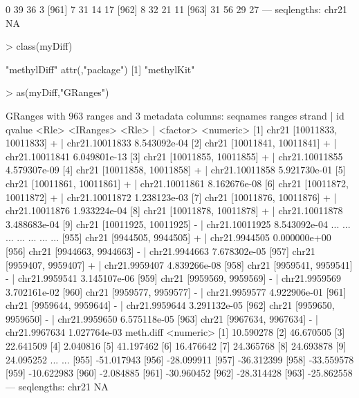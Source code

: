 \documentclass{article}
\begin{document}
\begin{Schunk}
\begin{Soutput}
  [960]         0        39        36         3
  [961]         7        31        14        17
  [962]         8        32        21        11
  [963]        31        56        29        27
  ---
  seqlengths:
   chr21
      NA
\end{Soutput}
\begin{Sinput}
> class(myDiff)
\end{Sinput}
\begin{Soutput}
[1] "methylDiff"
attr(,"package")
[1] "methylKit"
\end{Soutput}
\begin{Sinput}
> as(myDiff,"GRanges")
\end{Sinput}
\begin{Soutput}
GRanges with 963 ranges and 3 metadata columns:
        seqnames               ranges strand   |             id       qvalue
           <Rle>            <IRanges>  <Rle>   |       <factor>    <numeric>
    [1]    chr21 [10011833, 10011833]      +   | chr21.10011833 8.543092e-04
    [2]    chr21 [10011841, 10011841]      +   | chr21.10011841 6.049801e-13
    [3]    chr21 [10011855, 10011855]      +   | chr21.10011855 4.579307e-09
    [4]    chr21 [10011858, 10011858]      +   | chr21.10011858 5.921730e-01
    [5]    chr21 [10011861, 10011861]      +   | chr21.10011861 8.162676e-08
    [6]    chr21 [10011872, 10011872]      +   | chr21.10011872 1.238123e-03
    [7]    chr21 [10011876, 10011876]      +   | chr21.10011876 1.933224e-04
    [8]    chr21 [10011878, 10011878]      +   | chr21.10011878 3.488683e-04
    [9]    chr21 [10011925, 10011925]      -   | chr21.10011925 8.543092e-04
    ...      ...                  ...    ... ...            ...          ...
  [955]    chr21   [9944505, 9944505]      +   |  chr21.9944505 0.000000e+00
  [956]    chr21   [9944663, 9944663]      -   |  chr21.9944663 7.678302e-05
  [957]    chr21   [9959407, 9959407]      +   |  chr21.9959407 4.839266e-08
  [958]    chr21   [9959541, 9959541]      -   |  chr21.9959541 3.145107e-06
  [959]    chr21   [9959569, 9959569]      -   |  chr21.9959569 3.702161e-02
  [960]    chr21   [9959577, 9959577]      -   |  chr21.9959577 4.922906e-01
  [961]    chr21   [9959644, 9959644]      -   |  chr21.9959644 3.291132e-05
  [962]    chr21   [9959650, 9959650]      -   |  chr21.9959650 6.575118e-05
  [963]    chr21   [9967634, 9967634]      -   |  chr21.9967634 1.027764e-03
         meth.diff
         <numeric>
    [1]  10.590278
    [2]  46.670505
    [3]  22.641509
    [4]   2.040816
    [5]  41.197462
    [6]  16.476642
    [7]  24.365768
    [8]  24.693878
    [9]  24.095252
    ...        ...
  [955] -51.017943
  [956] -28.099911
  [957] -36.312399
  [958] -33.559578
  [959] -10.622983
  [960]  -2.084885
  [961] -30.960452
  [962] -28.314428
  [963] -25.862558
  ---
  seqlengths:
   chr21
      NA
\end{Soutput}
\end{Schunk}
\end{document}
